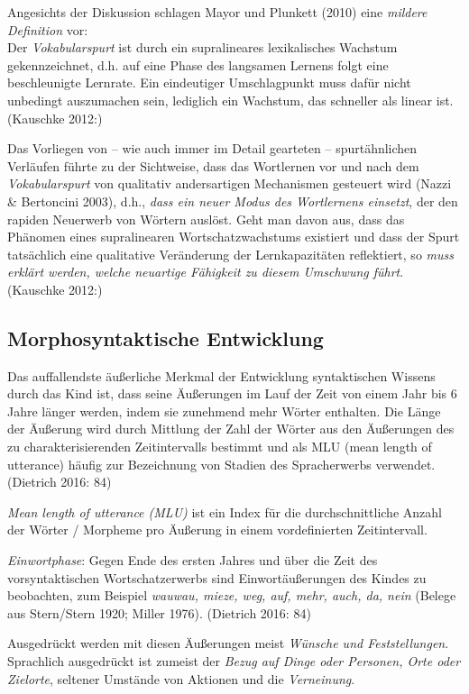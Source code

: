 \documentclass[
  letterpaper,
]{scrbook}
\begin{document}
Angesichts der Diskussion schlagen Mayor und Plunkett (2010) eine
\emph{mildere Definition} vor:\\
Der \emph{Vokabularspurt} ist durch ein supralineares lexikalisches
Wachstum gekennzeichnet, d.h. auf eine Phase des langsamen Lernens folgt
eine beschleunigte Lernrate. Ein eindeutiger Umschlagpunkt muss dafür
nicht unbedingt auszumachen sein, lediglich ein Wachstum, das schneller
als linear ist. (Kauschke 2012:)

Das Vorliegen von -- wie auch immer im Detail gearteten --
spurtähnlichen Verläufen führte zu der Sichtweise, dass das Wortlernen
vor und nach dem \emph{Vokabularspurt} von qualitativ andersartigen
Mechanismen gesteuert wird (Nazzi \& Bertoncini 2003), d.h., \emph{dass
ein neuer Modus des Wortlernens einsetzt}, der den rapiden Neuerwerb von
Wörtern auslöst. Geht man davon aus, dass das Phänomen eines
supralinearen Wortschatzwachstums existiert und dass der Spurt
tatsächlich eine qualitative Veränderung der Lernkapazitäten
reflektiert, so \emph{muss erklärt werden, welche neuartige Fähigkeit zu
diesem Umschwung führt}. (Kauschke 2012:)

\hypertarget{morphosyntaktische-entwicklung}{%
\subsection{Morphosyntaktische
Entwicklung}\label{morphosyntaktische-entwicklung}}

Das auffallendste äußerliche Merkmal der Entwicklung syntaktischen
Wissens durch das Kind ist, dass seine Äußerungen im Lauf der Zeit von
einem Jahr bis 6 Jahre länger werden, indem sie zunehmend mehr Wörter
enthalten. Die Länge der Äußerung wird durch Mittlung der Zahl der
Wörter aus den Äußerungen des zu charakterisierenden Zeitintervalls
bestimmt und als MLU (mean length of utterance) häufig zur Bezeichnung
von Stadien des Spracherwerbs verwendet. (Dietrich 2016: 84)

\emph{Mean length of utterance (MLU)} ist ein Index für die
durchschnittliche Anzahl der Wörter / Morpheme pro Äußerung in einem
vordefinierten Zeitintervall.

\emph{Einwortphase}: Gegen Ende des ersten Jahres und über die Zeit des
vorsyntaktischen Wortschatzerwerbs sind Einwortäußerungen des Kindes zu
beobachten, zum Beispiel \emph{wauwau, mieze, weg, auf, mehr, auch, da,
nein} (Belege aus Stern/Stern 1920; Miller 1976). (Dietrich 2016: 84)

Ausgedrückt werden mit diesen Äußerungen meist \emph{Wünsche und
Feststellungen}. Sprachlich ausgedrückt ist zumeist der \emph{Bezug auf
Dinge oder Personen, Orte oder Zielorte}, seltener Umstände von Aktionen
und die \emph{Verneinung}.
\end{document}
